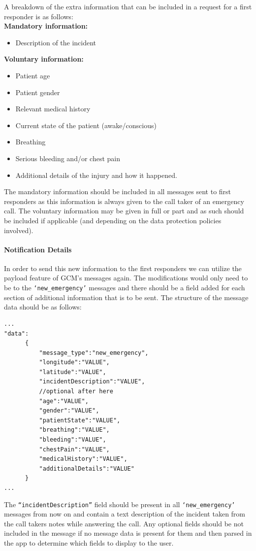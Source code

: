 \documentclass{article}
\begin{document}
A breakdown of the extra information that can be included in a request for a first responder is as follows:\\
\textbf{Mandatory information:}
\begin{itemize}
\item Description of the incident
\end{itemize}
\textbf{Voluntary information:}
\begin{itemize}
\item Patient age
\item Patient gender
\item Relevant medical history
\item Current state of the patient (awake/conscious)
\item Breathing
\item Serious bleeding and/or chest pain
\item Additional details of the injury and how it happened.
\end{itemize}
The mandatory information should be included in all messages sent to first responders as this information is always given to the call taker of an emergency call. The voluntary information may be given in full or part and as such should be included if applicable (and depending on the data protection policies involved).

\paragraph{Notification Details}
In order to send this new information to the first responders we can utilize the payload feature of GCM’s messages again. The modifications would only need to be to the \texttt{\color{OliveGreen}‘new\_emergency’} messages and there should be a field added for each section of additional information that is to be sent. The structure of the message data should be as follows:
\begin{lstlisting}
...
"data":
      {
          "message_type":"new_emergency",
          "longitude":"VALUE",
          "latitude":"VALUE",
          "incidentDescription":"VALUE",
		  //optional after here
          "age":"VALUE",
          "gender":"VALUE",
          "patientState":"VALUE",
          "breathing":"VALUE",
          "bleeding":"VALUE",
          "chestPain":"VALUE",
          "medicalHistory":"VALUE",
          "additionalDetails":"VALUE"
      }
...
\end{lstlisting}
The \texttt{\color{OliveGreen}“incidentDescription”} field should be present in all \texttt{\color{OliveGreen}‘new\_emergency’} messages from now on and contain a text description of the incident taken from the call takers notes while answering the call. Any optional fields should be not included in the message if no message data is present for them and then parsed in the app to determine which fields to display to the user.\\
\end{document}
